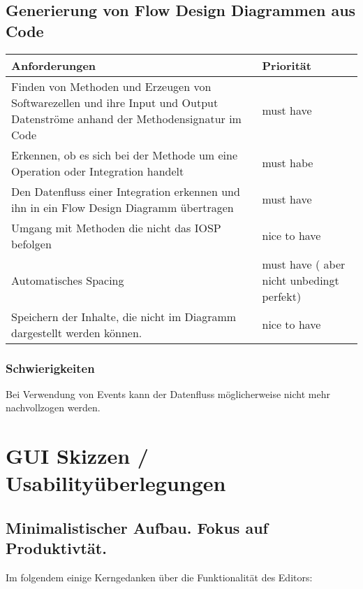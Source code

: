 \documentclass[11pt]{article}
\begin{document}
\subsection{Generierung von Flow Design Diagrammen aus Code}
\label{sec:orgheadline13}

\begin{center}
\begin{tabular}{ll}
Anforderungen & Priorität\\
\hline
Finden von Methoden und Erzeugen von Softwarezellen und ihre Input und Output Datenströme anhand der Methodensignatur im Code & must have\\
Erkennen, ob es sich bei der Methode um eine Operation oder Integration handelt & must habe\\
Den Datenfluss einer Integration erkennen und ihn in ein Flow Design Diagramm übertragen & must have\\
Umgang mit Methoden die nicht das IOSP befolgen & nice to have\\
Automatisches Spacing & must have ( aber nicht unbedingt perfekt)\\
Speichern der Inhalte, die nicht im Diagramm dargestellt werden können. & nice to have\\
\end{tabular}
\end{center}

\subsubsection{Schwierigkeiten}
\label{sec:orgheadline12}
Bei Verwendung von Events kann der Datenfluss möglicherweise nicht mehr
nachvollzogen werden.


\section{GUI Skizzen / Usabilityüberlegungen}
\label{sec:orgheadline20}

\subsection{Minimalistischer Aufbau. Fokus auf Produktivtät.}
\label{sec:orgheadline15}
Im folgendem einige Kerngedanken über die Funktionalität des Editors:
\end{document}
